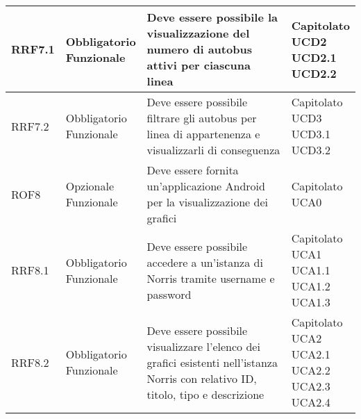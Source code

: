 \begin{longtabu}[c]{|X[0.7,l]|X[l]|X[2.5,l]|X[l]|}
                RRF7.1 & 
                \parbox[t]{4cm}{ Obbligatorio \\ Funzionale} & Deve essere possibile la visualizzazione del numero di autobus attivi per ciascuna linea & \parbox[t]{4cm}{Capitolato \\ UCD2 \\ UCD2.1 \\ UCD2.2 }  \\ 
                \hline
                
                RRF7.2 & 
                \parbox[t]{4cm}{ Obbligatorio \\ Funzionale} & Deve essere possibile filtrare gli autobus per linea di appartenenza e visualizzarli di conseguenza & \parbox[t]{4cm}{Capitolato \\ UCD3 \\ UCD3.1 \\ UCD3.2 }  \\ 
                \hline
                
                ROF8 & 
                \parbox[t]{4cm}{ Opzionale \\ Funzionale} & Deve essere fornita un'applicazione Android per la visualizzazione dei grafici & \parbox[t]{4cm}{Capitolato \\ UCA0 }  \\ 
                \hline
                
                RRF8.1 & 
                \parbox[t]{4cm}{ Obbligatorio \\ Funzionale} & Deve essere possibile accedere a un'istanza di Norris tramite username e password & \parbox[t]{4cm}{Capitolato \\ UCA1 \\ UCA1.1 \\ UCA1.2 \\ UCA1.3 }  \\ 
                \hline
                
                RRF8.2 & 
                \parbox[t]{4cm}{ Obbligatorio \\ Funzionale} & Deve essere possibile visualizzare l'elenco dei grafici esistenti nell'istanza Norris con relativo ID, titolo, tipo e descrizione & \parbox[t]{4cm}{Capitolato \\ UCA2 \\ UCA2.1 \\ UCA2.2 \\ UCA2.3 \\ UCA2.4 }  \\ 
                \hline
                

\end{longtabu}
